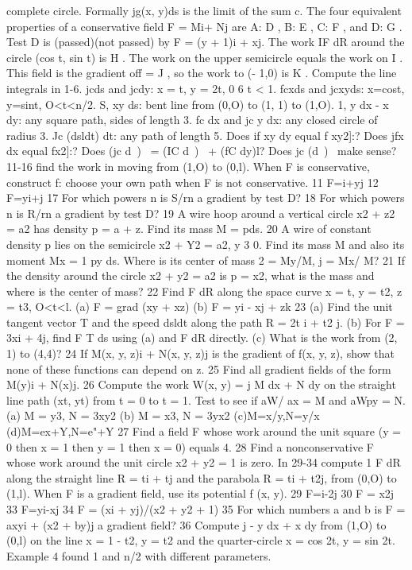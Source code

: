 complete circle. Formally jg(x, y)ds is the limit of the sum
c.
The four equivalent properties of a conservative field F =
Mi+ Nj are A: D , B: E , C: F , and D: G . Test D is (passed)(not passed) by F = (y + 1)i + xj. The work
IF dR around the circle (cos t, sin t) is H . The work on
the upper semicircle equals the work on I . This field is
the gradient off = J , so the work to (- 1,0) is K .
Compute the line integrals in 1-6.
jcds and jcdy: x = t, y = 2t, 0 6 t < 1.
fcxds and jcxyds: x=cost, y=sint, O<t<n/2.
S, xy ds: bent line from (0,O) to (1, 1) to (1,O).
1, y dx - x dy: any square path, sides of length 3.
fc dx and jc y dx: any closed circle of radius 3.
Jc (dsldt) dt: any path of length 5.
Does if xy dy equal f xy2]:?
Does jfx dx equal fx2]:?
Does (jc d~)~ = (IC d~)~ + (fC dy)l?
Does jc (d~)~ make sense?
11-16 find the work in moving from (1,O) to (0,l). When F
is conservative, construct f: choose your own path when F is
not conservative.
11 F=i+yj 12 F=yi+j
17 For which powers n is S/rn a gradient by test D?
18 For which powers n is R/rn a gradient by test D?
19 A wire hoop around a vertical circle x2 + z2 = a2 has
density p = a + z. Find its mass M = pds.
20 A wire of constant density p lies on the semicircle
x2 + Y2 = a2, y 3 0. Find its mass M and also its moment
Mx = 1 py ds. Where is its center of mass 2 = My/M, j = Mx/
M?
21 If the density around the circle x2 + y2 = a2 is p = x2, what
is the mass and where is the center of mass?
22 Find F dR along the space curve x = t, y = t2, z = t3,
O<t<l.
(a) F = grad (xy + xz) (b) F = yi - xj + zk
23 (a) Find the unit tangent vector T and the speed dsldt
along the path R = 2t i + t2 j.
(b) For F = 3xi + 4j, find F T ds using (a) and F dR
directly.
(c) What is the work from (2, 1) to (4,4)?
24 If M(x, y, z)i + N(x, y, z)j is the gradient of f(x, y, z), show
that none of these functions can depend on z.
25 Find all gradient fields of the form M(y)i + N(x)j.
26 Compute the work W(x, y) = j M dx + N dy on the
straight line path (xt, yt) from t = 0 to t = 1. Test to see if aW/
ax = M and aWpy = N.
(a) M = y3, N = 3xy2 (b) M = x3, N = 3yx2
(c)M=x/y,N=y/x (d)M=ex+Y,N=e"+Y
27 Find a field F whose work around the unit square (y = 0
then x = 1 then y = 1 then x = 0) equals 4.
28 Find a nonconservative F whose work around the unit
circle x2 + y2 = 1 is zero.
In 29-34 compute 1 F dR along the straight line R = ti + tj
and the parabola R = ti + t2j, from (0,O) to (1,l). When F is a
gradient field, use its potential f (x, y).
29 F=i-2j 30 F = x2j
33 F=yi-xj 34 F = (xi + yj)/(x2 + y2 + 1)
35 For which numbers a and b is F = axyi + (x2 + by)j a
gradient field?
36 Compute j - y dx + x dy from (1,O) to (0,l) on the line
x = 1 - t2, y = t2 and the quarter-circle x = cos 2t, y = sin 2t.
Example 4 found 1 and n/2 with different parameters. 

